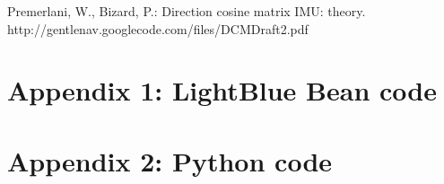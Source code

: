 \documentclass[10pt,journal]{IEEEtran}
\begin{document}
\begin{thebibliography}{1}
 Premerlani, W., Bizard, P.: Direction cosine matrix	IMU: theory. http://gentlenav.googlecode.com/files/DCMDraft2.pdf
\end{thebibliography}

\newpage
\onecolumn

\section{Appendix 1: LightBlue Bean code}
\small{

}

\section{Appendix 2: Python code}
\small{

}
\end{document}
